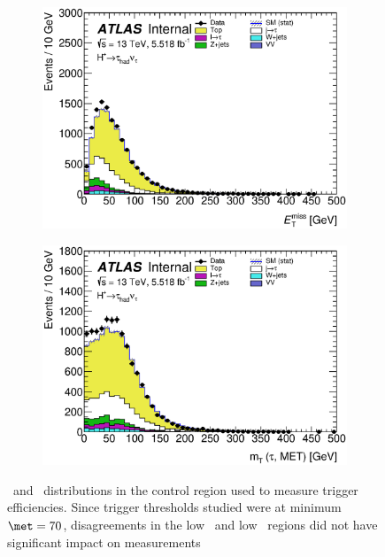 \begin{figure}[!h]
\begin{subfigure}{0.5\textwidth}
   \includegraphics[width=\textwidth]{figures/all_CutNoMatchNbjets_met_lin_forTriggers.eps}
\end{subfigure} %
\begin{subfigure}{0.5\textwidth}
   \includegraphics[width=\textwidth]{figures/all_CutNoMatchNbjets_mT_lin_forTriggers.eps}
\end{subfigure}
\caption{\met\ and \mT\ distributions in the control region used to measure trigger efficiencies. Since trigger thresholds 
studied were at minimum $\met=70$, disagreements in the low \met\ and low \mT\ regions did not have significant impact on 
measurements}
\label{fig:trigReg}
\end{figure}

